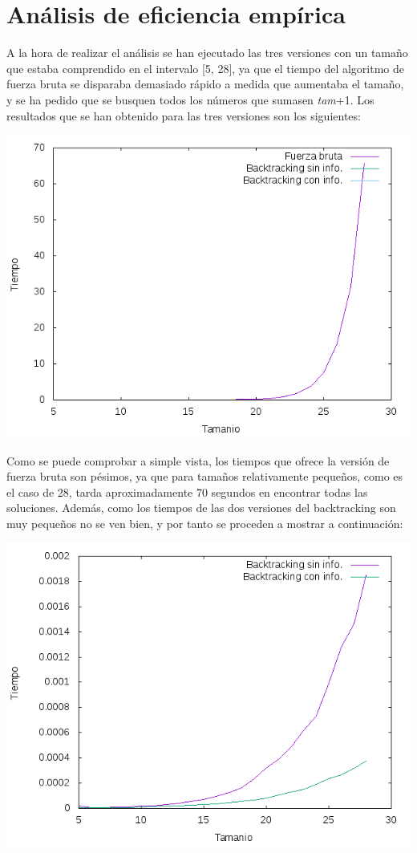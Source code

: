 \documentclass{article}
\begin{document}
  \section{Análisis de eficiencia empírica}
  A la hora de realizar el análisis se han ejecutado las tres versiones con un tamaño que estaba comprendido en el intervalo [5, 28], ya que el tiempo del algoritmo de fuerza bruta se disparaba demasiado rápido a medida que aumentaba el tamaño, y se ha pedido que se busquen todos los números que sumasen \textit{tam}+1. Los resultados que se han obtenido para las tres versiones son los siguientes:
  \begin{center}
  \includegraphics[scale=0.70]{screenshots/comparacion_3.png}
  \end{center}
  Como se puede comprobar a simple vista, los tiempos que ofrece la versión de fuerza bruta son pésimos, ya que para tamaños relativamente pequeños, como es el caso de 28, tarda aproximadamente 70 segundos en encontrar todas las soluciones. Además, como los tiempos de las dos versiones del backtracking son muy pequeños no se ven bien, y por tanto se proceden a mostrar a continuación:
  \begin{center}
  \includegraphics[scale=0.70]{screenshots/comparacion_back_28.png}
  \end{center}
\end{document}
